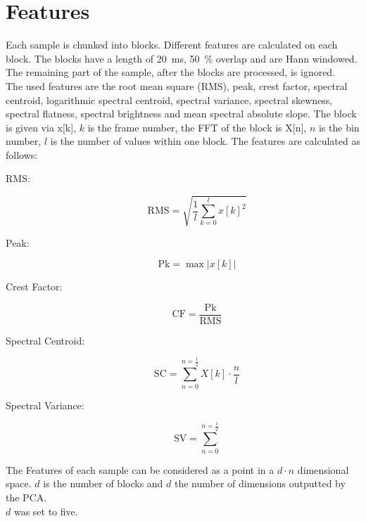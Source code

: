 \section{Features}
\label{sec:Features}
Each sample is chunked into blocks. Different features are calculated on each block. The blocks have a length of 20~ms, 50~\% overlap and are Hann windowed. The remaining part of the sample, after the blocks are processed, is ignored.\\
The used features are the root mean square (RMS), peak, crest factor, spectral centroid, logarithmic spectral centroid, spectral variance, spectral skewness, spectral flatness, spectral brightness and mean spectral absolute slope. The block is given via x[k], $k$ is the frame number, the FFT of the block is X[n], $n$ is the bin number, $l$ is the number of values within one block. The features are calculated as follows:
\begin{description}
    \item[RMS:]
        \[
            \mathrm{RMS} = \sqrt{\frac{1}{l}\sum_{k=0}^{l}{x[k]^2}}
        \]
    \item[Peak:]
        \[
            \mathrm{Pk} = \max{|x[k]|}
        \]
    \item[Crest Factor:]
        \[
            \mathrm{CF} = \frac{\mathrm{Pk}}{\mathrm{RMS}}
        \]
    \item[Spectral Centroid:]
        \[
            \mathrm{SC} = \sum_{n=0}^{n=\frac{l}{2}}{X[k]\cdot \frac{n}{l}}
        \]
    \item[Spectral Variance:]
        \[
            \mathrm{SV} = \sum_{n=0}^{n=\frac{l}{2}}{}
        \]
\end{description}


The Features of each sample can be considered as a point in a $d \cdot n$ dimensional space. $d$ is the number of blocks and $d$ the number of dimensions outputted by the PCA.\\
$d$ was set to five.